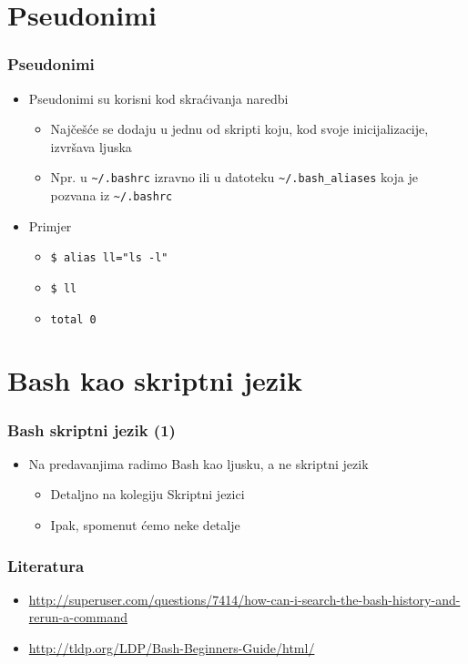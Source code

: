 \documentclass[table,usenames,dvipsnames]{beamer}
\newcommand{\shell}[1]{\texttt{#1}}
\begin{document}
\section{Pseudonimi}
\begin{frame}[t]
\frametitle{Pseudonimi}
\begin{itemize}
  \item Pseudonimi su korisni kod skraćivanja naredbi
  \begin{itemize}
    \item Najčešće se dodaju u jednu od skripti koju, kod svoje 
          inicijalizacije, izvršava ljuska
    \item Npr. u \shell{\~{}/.bashrc} izravno ili u datoteku 
          \shell{\~{}/.bash\_aliases} koja je pozvana iz 
          \shell{\~{}/.bashrc}
  \end{itemize}
  \item Primjer
  \begin{itemize}
    \item[] \shell{\$ alias ll="ls -l"}
    \item[] \shell{\$ ll}
    \item[] \shell{total 0}
  \end{itemize}
\end{itemize}
\end{frame}

\section{Bash kao skriptni jezik}
\begin{frame}[t]
\frametitle{Bash skriptni jezik (1)}
\begin{itemize}
  \item Na predavanjima radimo Bash kao ljusku, a ne skriptni jezik
  \begin{itemize}
    \item Detaljno na kolegiju Skriptni jezici
    \item Ipak, spomenut ćemo neke detalje
  \end{itemize}
\end{itemize}
\end{frame}

\begin{frame}[t]
\frametitle{Literatura}
\begin{itemize}
  \item \url{http://superuser.com/questions/7414/how-can-i-search-the-bash-history-and-rerun-a-command}
  \item \url{http://tldp.org/LDP/Bash-Beginners-Guide/html/}
\end{itemize}
\end{frame}
\end{document}
